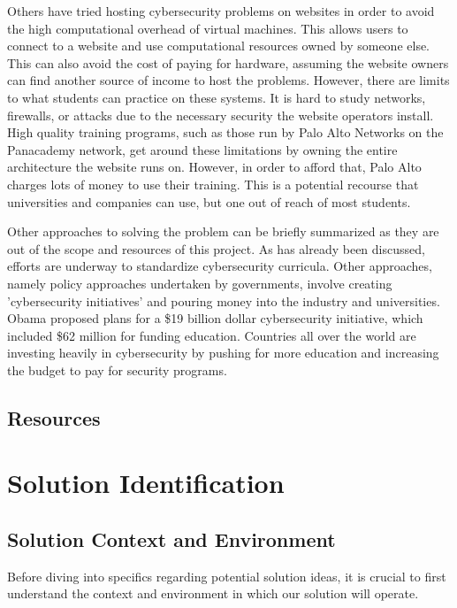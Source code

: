\documentclass[openright]{report}
\begin{document}
\par Others have tried hosting cybersecurity problems on websites in order to avoid the high computational overhead of virtual machines\cite{website_probs}. This allows users to connect to a website and use computational resources owned by someone else. This can also avoid the cost of paying for hardware, assuming the website owners can find another source of income to host the problems. However, there are limits to what students can practice on these systems. It is hard to study networks, firewalls, or attacks due to the necessary security the website operators install. High quality training programs, such as those run by Palo Alto Networks on the Panacademy network, get around these limitations by owning the entire architecture the website runs on. However, in order to afford that, Palo Alto charges lots of money to use their training\cite{palo_alto}. This is a potential recourse that universities and companies can use, but one out of reach of most students.

\par Other approaches to solving the problem can be briefly summarized as they are out of the scope and resources of this project. As has already been discussed, efforts are underway to standardize cybersecurity curricula. Other approaches, namely policy approaches undertaken by governments, involve creating 'cybersecurity initiatives' and pouring money into the industry and universities. Obama proposed plans for a \$19 billion dollar cybersecurity initiative, which included \$62 million for funding education\cite{why_no_cyber_classes}. Countries all over the world are investing heavily in cybersecurity by pushing for more education and increasing the budget to pay for security programs.

\section{Resources}

\chapter{Solution Identification}

\section{Solution Context and Environment}

\par Before diving into specifics regarding potential solution ideas, it is crucial to first understand the context and environment in which our solution will operate.
\end{document}
